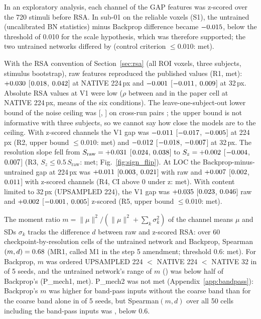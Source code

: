 In an exploratory analysis, each channel of the GAP features was z-scored over the 720
stimuli before RSA. In sub-01 on the reliable voxels (S1), the untrained (uncalibrated
BN statistics) minus Backprop difference became $-0.015$, below the threshold of
0.010 for the scale hypothesis, which was therefore supported; the two untrained
networks differed by \SOneStdRandBncal{} (control criterion $\leq 0.010$: met).

With the RSA convention of Section~\ref{sec:rsa} (all ROI voxels, three subjects,
stimulus bootstrap), raw features reproduced the published values (R1, met):
$+0.030$ [$0.018$, $0.042$] at NATIVE
224\,px and $-0.001$ [$-0.011$, $0.009$] at 32\,px.
Absolute RSA values at V1 were low ($\rho$ between \AbsRsaPaperMin{} and \AbsRsaPaperMax{}
in the paper cell at NATIVE 224\,px, means of the six conditions). The leave-one-subject-out
lower bound of the noise ceiling was \LosoBoundVone{} [\LosoBoundVoneLo, \LosoBoundVoneHi] on
cross-run pairs \citep{leutenegger2026}; the upper bound is not informative with three
subjects, so we cannot say how close the models are to the ceiling. With z-scored channels the V1 gap was $-0.011$
[$-0.017$, $-0.005$] at 224\,px (R2, upper bound
$\leq 0.010$: met) and $-0.012$ [$-0.018$, $-0.007$]
at 32\,px. The resolution slope fell from $S_{\mathrm{raw}} = +0.031$
[$0.024$, $0.038$] to $S_z = +0.002$ [$-0.004$, $0.007$]
(R3, $S_z \leq 0.5\,S_{\mathrm{raw}}$: met; Fig.~\ref{fig:sign_flip}). At LOC the
Backprop-minus-untrained gap at 224\,px was $+0.011$ [$0.003$, $0.021$]
with raw and $+0.007$ [$0.002$, $0.011$] with z-scored channels (R4, CI above
0 under z: met). With content limited to 32\,px (UPSAMPLED 224), the V1 gap was
$+0.035$ [$0.023$, $0.046$] raw and $+0.002$
[$-0.001$, $0.005$] z-scored (R5, upper bound $\leq 0.010$: met).

The moment ratio $m = \lVert\mu\rVert^2 / (\lVert\mu\rVert^2 + \sum_k \sigma_k^2)$ of the
channel means $\mu$ and SDs $\sigma_k$ tracks the difference $d$ between raw and
z-scored RSA: over 60 checkpoint-by-resolution cells of the untrained network and
Backprop, Spearman$(m, d) = 0.68$ (MR1, called M1 in the step 5 amendment; threshold 0.6: met). For Backprop, $m$ was
ordered UPSAMPLED 224 $<$ NATIVE 224 $<$ NATIVE 32 in \PMechOneBpSeeds{} of 5 seeds, and
the untrained network's range of $m$ (\PMechOneRandRange) was below half of Backprop's
(P\_mech1, met). P\_mech2 was not met (Appendix~\ref{app:bandpass}): Backprop's $m$ was higher for band-pass inputs
without the coarse band than for the coarse band alone in \PMechTwoNotchSeeds{} of 5
seeds, but Spearman$(m, d)$ over all 50 cells including the band-pass inputs was
\PMechTwoSpearman, below 0.6.

